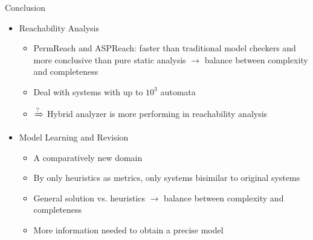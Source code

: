 \documentclass[8pt]{beamer}
\begin{document}
\begin{frame}{Conclusion}
\begin{itemize}
    \item Reachability Analysis
    \begin{itemize}
        \item PermReach and ASPReach: faster than traditional model checkers and more conclusive than pure static analysis $\to$ balance between complexity and completeness
        \item Deal with systems with up to $10^3$ automata
        \item $\xRightarrow{\text{?}}$ Hybrid analyzer is more performing in reachability analysis
    \end{itemize}
    \item Model Learning and Revision
    \begin{itemize}
        \item A comparatively new domain
        \item By only heuristics as metrics, only systems bisimilar to original systems
        \item General solution vs. heuristics $\to$ balance between complexity and completeness
        \item More information needed to obtain a precise model 
    \end{itemize}
\end{itemize}
\end{frame}
\end{document}
